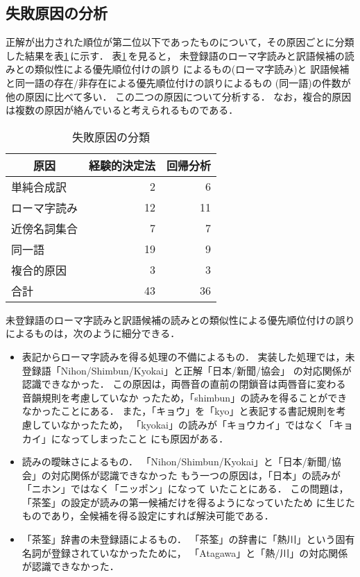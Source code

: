 \subsection{失敗原因の分析}
\label{sec:experiment:failure}

正解が出力された順位が第二位以下であったものについて，その原因ごとに分類
した結果を表\ref{tab:cause_of_failure}\,に示す．
表\ref{tab:cause_of_failure}\,を見ると，
未登録語のローマ字読みと訳語候補の読みとの類似性による優先順位付けの誤り
によるもの(ローマ字読み)と
訳語候補と同一語の存在/非存在による優先順位付けの誤りによるもの
(同一語)の件数が他の原因に比べて多い．
この二つの原因について分析する．
なお，複合的原因は複数の原因が絡んでいると考えられるものである．
\begin{table}[htbp]
\caption{失敗原因の分類}
\label{tab:cause_of_failure}
\begin{center}
\begin{tabular}{|l||r|r|}\hline
\multicolumn{1}{|c||}{原因} & \multicolumn{1}{c|}{経験的決定法} 
& \multicolumn{1}{c|}{回帰分析} \\\hline\hline
単純合成訳   &  2 &  6 \\
ローマ字読み & 12 & 11 \\
近傍名詞集合 &  7 &  7 \\
同一語       & 19 &  9 \\
複合的原因   &  3 &  3 \\\hline
合計         & 43 & 36 \\\hline
\end{tabular}
\end{center}
\end{table}

未登録語のローマ字読みと訳語候補の読みとの類似性による優先順位付けの誤り
によるものは，次のように細分できる．
\begin{itemize}
\item 
表記からローマ字読みを得る処理の不備によるもの．
実装した処理では，未登録語「Nihon/Shimbun/Kyokai」と正解「日本/新聞/協会」
の対応関係が認識できなかった．
この原因は，両唇音の直前の閉鎖音は両唇音に変わる音韻規則を考慮していなか
ったため，「shimbun」の読みを得ることができなかったことにある．
また，「キョウ」を「kyo」と表記する書記規則を考慮していなかったため，
「kyokai」の読みが「キョウカイ」ではなく「キョカイ」になってしまったこと
にも原因がある．
\item 
読みの曖昧さによるもの．
「Nihon/Shimbun/Kyokai」と「日本/新聞/協会」の対応関係が認識できなかった
もう一つの原因は，「日本」の読みが「ニホン」ではなく「ニッポン」になって
いたことにある．
この問題は，「茶筌」の設定が読みの第一候補だけを得るようになっていたため
に生じたものであり，全候補を得る設定にすれば解決可能である．
\item
「茶筌」辞書の未登録語によるもの．
「茶筌」の辞書に「熱川」という固有名詞が登録されていなかったために，
「Atagawa」と「熱/川」の対応関係が認識できなかった．
\end{itemize}


